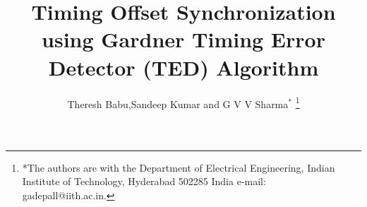\documentclass[journal,12pt,twocolumn]{IEEEtran}
\begin{document}

\makeatletter
{}
\makeatother

\let\StandardTheFigure\thefigure
\let\StandardTheTable\thetable





\def\putbox#1#2#3{\makebox[0in][l]{\makebox[#1][l]{}\raisebox{\baselineskip}[0in][0in]{\raisebox{#2}[0in][0in]{#3}}}}
     \def\rightbox#1{\makebox[0in][r]{#1}}
     \def\centbox#1{\makebox[0in]{#1}}
     \def\topbox#1{\raisebox{-\baselineskip}[0in][0in]{#1}}
     \def\midbox#1{\raisebox{-0.5\baselineskip}[0in][0in]{#1}}



\title{ 
Timing Offset Synchronization using Gardner Timing Error Detector (TED) Algorithm
}



\author{Theresh Babu,Sandeep Kumar and G V V Sharma$^{*}$%
\thanks{*The authors are with the Department
of Electrical Engineering, Indian Institute of Technology, Hyderabad
502285 India e-mail:  gadepall@iith.ac.in.}
}


\maketitle

\tableofcontents

%

%
\end{document}
